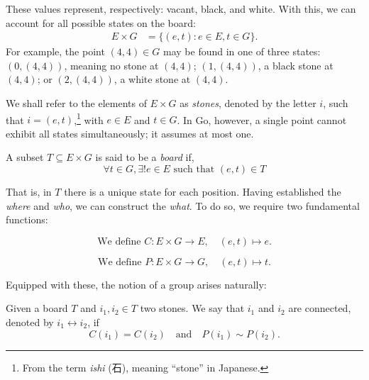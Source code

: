 These values represent, respectively: vacant, black, and white. With this, we can account for all possible states on the board:
\begin{align*}
	E \times G &= \{(e,t) : e \in E, t \in G \}.
\end{align*}
For example, the point \((4,4) \in G\) may be found in one of three states: \((0,(4,4))\), meaning no stone at \((4,4)\); \((1,(4,4))\), a black stone at \((4,4)\); or \((2,(4,4))\), a white stone at \((4,4)\).


We shall refer to the elements of \(E \times G\) as \textit{stones}, denoted by the letter \(i\), such that \(i=(e,t)\),\footnote{From the term \textit{ishi} (石), meaning ``stone'' in Japanese.} with \(e \in E\) and \(t \in G\). In Go, however, a single point cannot exhibit all states simultaneously; it assumes at most one.

\begin{definition}[Board]
	A subset \(T \subseteq E \times G\) is said to be a \textit{board} if,
	$$\forall t \in G, \exists! e \in E \text{ such that } (e, t) \in T$$

\end{definition}

That is, in $T$ there is a unique state for each position. Having established the \textit{where} and \textit{who}, we can construct the \textit{what}. To do so, we require two fundamental functions:

\begin{definition}
	\label{funcioncolor}$$\text{We define } C: E \times G \to E, \quad (e,t) \mapsto e.$$
	\end{definition}
	
\begin{definition}
	\label{funcionposiciion}$$\text{We define } P: E \times G \to G, \quad (e,t) \mapsto t.$$
	\end{definition}
	
Equipped with these, the notion of a group arises naturally:

\begin{definition}[Connection]
	Given a board $T$ and $i_1, i_2 \in T$ two stones. We say that $i_1$ and $i_2$ are connected, denoted by $i_1 \leftrightarrow i_2$, if
	$$C(i_1) = C(i_2) \quad \text{and} \quad P(i_1) \sim P(i_2).$$
\end{definition}


